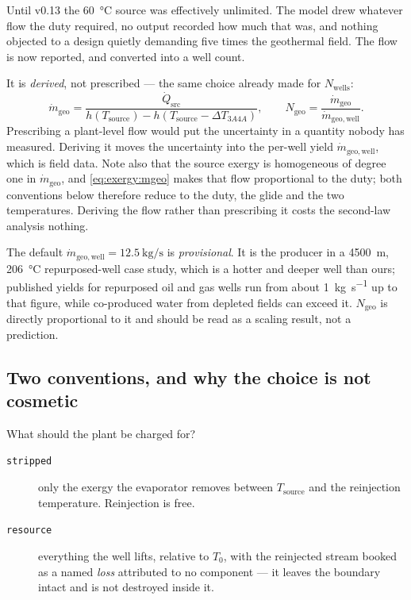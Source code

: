 Until v0.13 the \SI{60}{\celsius} source was effectively unlimited. The model
drew whatever flow the duty required, no output recorded how much that was,
and nothing objected to a design quietly demanding five times the geothermal
field. The flow is now reported, and converted into a well count.

It is \emph{derived}, not prescribed --- the same choice already made for
$N_{\mathrm{wells}}$:
%
\begin{equation}
  \dot m_{\mathrm{geo}}
  = \frac{\dot Q_{\mathrm{src}}}
         {h(T_{\mathrm{source}}) - h(T_{\mathrm{source}} - \Delta T_{3A4A})},
  \qquad
  N_{\mathrm{geo}} = \frac{\dot m_{\mathrm{geo}}}{\dot m_{\mathrm{geo,well}}} .
  \label{eq:exergy:mgeo}
\end{equation}
%
Prescribing a plant-level flow would put the uncertainty in a quantity nobody
has measured. Deriving it moves the uncertainty into the per-well yield
$\dot m_{\mathrm{geo,well}}$, which is field data. Note also that the source
exergy is homogeneous of degree one in $\dot m_{\mathrm{geo}}$, and
\eqref{eq:exergy:mgeo} makes that flow proportional to the duty; both
conventions below therefore reduce to the duty, the glide and the two
temperatures. Deriving the flow rather than prescribing it costs the
second-law analysis nothing.

The default $\dot m_{\mathrm{geo,well}} = \SI{12.5}{\kilo\gram\per\second}$ is
\emph{provisional}. It is the producer in a \SI{4500}{\metre},
\SI{206}{\celsius} repurposed-well case study, which is a hotter and deeper
well than ours; published yields for repurposed oil and gas wells run from
about \SI{1}{\kilo\gram\per\second} up to that figure, while co-produced water
from depleted fields can exceed it. $N_{\mathrm{geo}}$ is directly
proportional to it and should be read as a scaling result, not a prediction.

\subsection{Two conventions, and why the choice is not cosmetic}
\label{sec:exergy:convention}

What should the plant be charged for?

\begin{description}
  \item[\texttt{stripped}] only the exergy the evaporator removes between
    $T_{\mathrm{source}}$ and the reinjection temperature. Reinjection is
    free.
  \item[\texttt{resource}] everything the well lifts, relative to $T_0$, with
    the reinjected stream booked as a named \emph{loss} attributed to no
    component --- it leaves the boundary intact and is not destroyed inside
    it.
\end{description}

